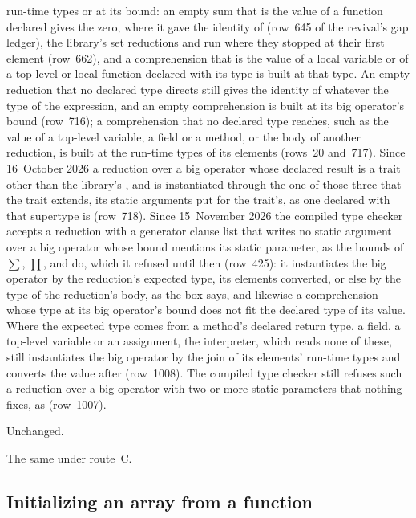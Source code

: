 \begin{description}
run-time types or at its bound: an empty sum that is the value of a function
declared  gives the  zero, where it gave
the identity of  (row~645 of the revival's gap ledger), the
library's set reductions \EXP{\bigcup} and \EXP{\bigcap} run where they
stopped at their first element (row~662), and a comprehension that is the
value of a local variable or of a top-level or local function declared with its
type is built at that type.
An empty reduction that no declared type directs still gives the identity of
 whatever the type of the expression, and an empty
comprehension is built at its big operator's bound (row~716); a
comprehension that no declared type reaches, such as the value of a top-level
variable, a field or a method, or the body of another reduction, is built at
the run-time types of its elements (rows~20 and~717). Since 16~October 2026 a
reduction over a big operator whose declared result is a trait other than the
library's ,  and  is
instantiated through the one of those three that the trait extends, its static
arguments put for the trait's, as one declared with that supertype is (row~718).
Since 15~November 2026 the compiled type checker accepts a reduction with a
generator clause list that writes no static argument over a big operator whose
bound mentions its static parameter, as the bounds of $\sum$, $\prod$,
 and  do, which it
refused until then (row~425): it instantiates the big operator by the
reduction's expected type, its elements converted, or else by the type of the
reduction's body, as the box says, and likewise a comprehension whose type at
its big operator's bound does not fit the declared type of its value.
Where the expected type comes from a method's declared return type, a field,
a top-level variable or an assignment, the interpreter, which
reads none of these, still instantiates the big operator by the join of its
elements' run-time types and converts the value after (row~1008).
The compiled type checker still refuses such a reduction over a big operator
with two or more static parameters that nothing fixes, as
 (row~1007).
\item[Original text] Unchanged.
\item[Route C] The same under route~C.
\end{description}

\subsection{Initializing an array from a function}

